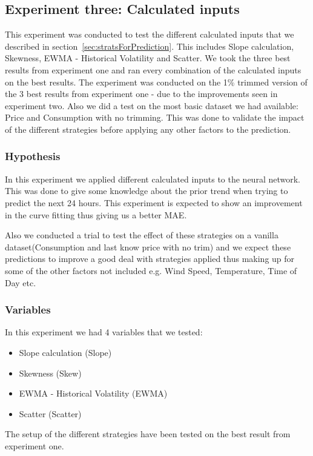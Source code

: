 \newpage
\subsection{Experiment three: Calculated inputs}
\label{sec:priceExperimentThree}
This experiment was conducted to test the different calculated inputs that we described in section~\ref{sec:stratsForPrediction}. This includes Slope calculation, Skewness, EWMA - Historical Volatility and Scatter. We took the three best results from experiment one and ran every combination of the calculated inputs on the best results. The experiment was conducted on the 1\% trimmed version of the 3 best results from experiment one - due to the improvements seen in experiment two. Also we did a test on the most basic dataset we had available: Price and Consumption with no trimming. This was done to validate the impact of the different strategies before applying any other factors to the prediction.

\subsubsection{Hypothesis}
In this experiment we applied different calculated inputs to the neural network. This was done to give some knowledge about the prior trend when trying to predict the next 24 hours. This experiment is expected to show an improvement in the curve fitting thus giving us a better MAE.

Also we conducted a trial to test the effect of these strategies on a vanilla dataset(Consumption and last know price with no trim) and we expect these predictions to improve a good deal with strategies applied thus making up for some of the other factors not included e.g. Wind Speed, Temperature, Time of Day etc.

\subsubsection{Variables}
In this experiment we had 4 variables that we tested:
\begin{itemize}
	\item Slope calculation (Slope)
	\item Skewness (Skew)
	\item EWMA - Historical Volatility (EWMA)
	\item Scatter (Scatter)
\end{itemize}

The setup of the different strategies have been tested on the best result from experiment one.

